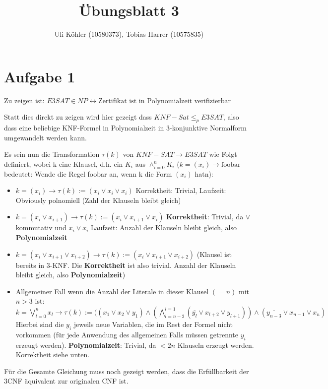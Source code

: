\documentclass[a4paper,10pt,oneside,reqno]{scrartcl}
\title{Übungsblatt 3}
\author{Uli Köhler (10580373), Tobias Harrer (10575835)}
\begin{document}
\maketitle
\section*{Aufgabe 1}%

Zu zeigen ist: $E3SAT \in {NP} \leftrightarrow \text{Zertifikat ist in Polynomialzeit verifizierbar}$

Statt dies direkt zu zeigen wird hier gezeigt dass $KNF-Sat \leq_p E3SAT$, also dass eine beliebige KNF-Formel in Polynomialzeit in 3-konjunktive Normalform umgewandelt werden kann.

Es sein nun die Transformation $\tau(k)$ von $KNF-SAT \rightarrow E3SAT$ wie Folgt definiert, wobei k eine Klausel, d.h. ein $K_i$ aus $\wedge_{i=0}^n K_i$ ($k = (x_i) \rightarrow \text{foobar}$ bedeutet: Wende die Regel foobar an, wenn k die Form $(x_i)$ hatn):
\begin{itemize}
 \item  $k = (x_i) \rightarrow \tau(k) := (x_i \vee x_i \vee x_i)$ Korrektheit: Trivial, Laufzeit: Obviously polnomiell (Zahl der Klauseln bleibt gleich)
 \item  $k = (x_i \vee x_{i+1}) \rightarrow \tau(k) :=  (x_i \vee x_{i+1} \vee x_i)$  \textbf{Korrektheit}: Trivial, da $\vee$ kommutativ und $x_i \vee x_i$ Laufzeit: Anzahl der Klauseln bleibt gleich, also \textbf{Polynomialzeit}
 \item $k = (x_i \vee x_{i+1} \vee x_{i+2}) \rightarrow \tau(k) := (x_i \vee x_{i+1} \vee x_{i+2})$ (Klausel ist bereits in 3-KNF. Die  \textbf{Korrektheit} ist also trivial. Anzahl der Klauseln bleibt gleich, also \textbf{Polynomialzeit})
 \item Allgemeiner Fall wenn die Anzahl der Literale in dieser Klausel $(=n)$ mit $n > 3$ ist: $k = \bigvee_{l=0}^{n} x_l \rightarrow \tau(k) := ( (x_1 \vee x_2 \vee y_1) \wedge (\bigwedge_{l=n-2}^{l=1} (\overline{y_l} \vee x_{l + 2} \vee y_{l+1})) \wedge (\overline{y_{n-3}} \vee x_{n-1} \vee x_{n})$ 
Hierbei sind die $y_i$ jeweils neue Variablen, die im Rest der Formel nicht vorkommen (für jede Anwendung des allgemeinen Falls müssen getrennte $y_i$ erzeugt werden). \textbf{Polynomialzeit}: Trivial, da $< 2n$ Klauseln erzeugt werden. Korrektheit siehe unten.
\end{itemize}

Für die Gesamte Gleichung muss noch gezeigt werden, dass die Erfüllbarkeit der 3CNF äquivalent zur originalen CNF ist.
\end{document}
